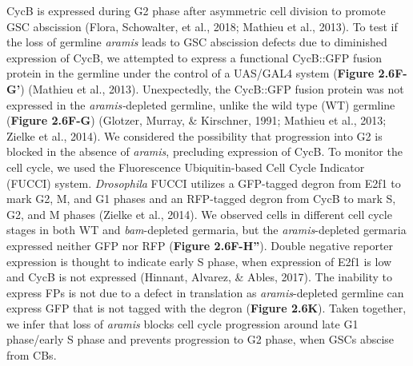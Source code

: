 \documentclass[12pt,oneside]{reedthesis}
\begin{document}
CycB is expressed during G2 phase after asymmetric cell division to
promote GSC abscission (Flora, Schowalter, et al., 2018; Mathieu et al., 2013). To test if the
loss of germline \emph{aramis} leads to GSC abscission defects due to
diminished expression of CycB, we attempted to express a functional
CycB::GFP fusion protein in the germline under the control of a UAS/GAL4
system (\textbf{Figure 2.6F-G'}) (Mathieu et al., 2013). Unexpectedly, the
CycB::GFP fusion protein was not expressed in the \emph{aramis-}depleted
germline, unlike the wild type (WT) germline (\textbf{Figure 2.6F-G})
(Glotzer, Murray, \& Kirschner, 1991; Mathieu et al., 2013; Zielke et al., 2014).
We considered the possibility that progression into G2 is blocked in the
absence of \emph{aramis}, precluding expression of CycB. To monitor the cell
cycle, we used the Fluorescence Ubiquitin-based Cell Cycle Indicator
(FUCCI) system. \emph{Drosophila} FUCCI utilizes a GFP-tagged degron from
E2f1 to mark G2, M, and G1 phases and an RFP-tagged degron from CycB to
mark S, G2, and M phases (Zielke et al., 2014). We observed cells in
different cell cycle stages in both WT and \emph{bam}-depleted germaria, but
the \emph{aramis}-depleted germaria expressed neither GFP nor RFP (\textbf{Figure 2.6F-H''}). Double negative reporter expression is thought to indicate
early S phase, when expression of E2f1 is low and CycB is not expressed
(Hinnant, Alvarez, \& Ables, 2017). The inability to express FPs is
not due to a defect in translation as \emph{aramis}-depleted germline can
express GFP that is not tagged with the degron (\textbf{Figure 2.6K}).
Taken together, we infer that loss of \emph{aramis} blocks cell cycle
progression around late G1 phase/early S phase and prevents progression
to G2 phase, when GSCs abscise from CBs.
\end{document}
